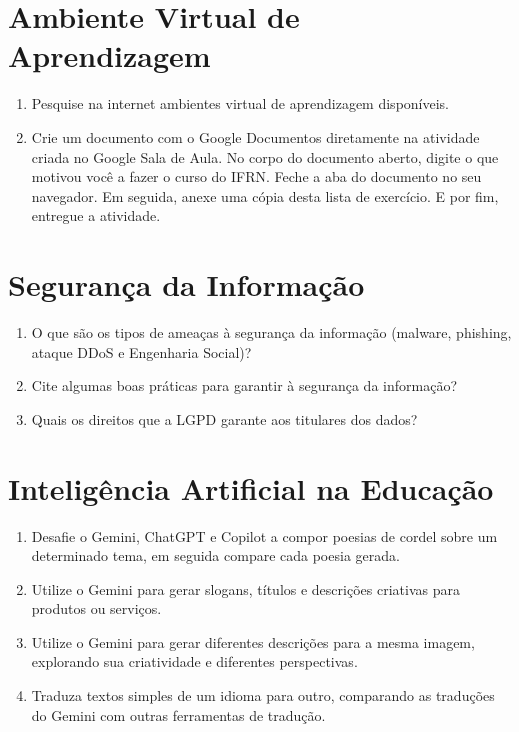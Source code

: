 \documentclass[11pt]{article}
\begin{document}
\section{Ambiente Virtual de Aprendizagem}

	\begin{enumerate}
		\item Pesquise na internet ambientes virtual de aprendizagem disponíveis.
		\item Crie um documento com o Google Documentos diretamente na atividade criada no Google Sala de Aula. No corpo do documento aberto, digite o que motivou você a fazer o curso do IFRN. Feche a aba do documento no seu navegador. Em seguida, anexe uma cópia desta lista de exercício. E por fim, entregue a atividade.
	\end{enumerate}

\section{Segurança da Informação}

	\begin{enumerate}
		\item O que são os tipos de ameaças à segurança da informação (malware, phishing, ataque DDoS e Engenharia Social)?
		\item Cite algumas boas práticas para garantir à segurança da informação?
		\item Quais os direitos que a LGPD garante aos titulares dos dados?
	\end{enumerate}

\section{Inteligência Artificial na Educação}

\begin{enumerate}
		\item Desafie o Gemini, ChatGPT e Copilot a compor poesias de cordel sobre um determinado tema, em seguida compare cada poesia gerada.
		\item Utilize o Gemini para gerar slogans, títulos e descrições criativas para produtos ou serviços.
		\item Utilize o Gemini para gerar diferentes descrições para a mesma imagem, explorando sua criatividade e diferentes perspectivas.
		\item Traduza textos simples de um idioma para outro, comparando as traduções do Gemini com outras ferramentas de tradução.
\end{enumerate}
\end{document}

